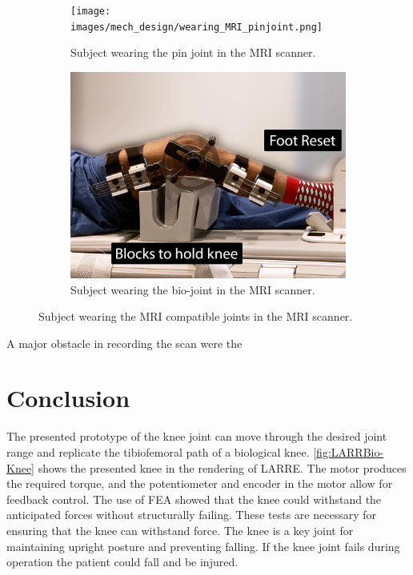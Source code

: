 \begin{figure}
    \begin{subfigure}{\textwidth}
        \centering
        \captionsetup{justification=centering}
        \texttt{[image: images/mech\_design/wearing\_MRI\_pinjoint.png]}
        \caption[Pin Joint in MRI ]{Subject wearing the pin joint in the MRI scanner.}
        \label{fig:MRIPINJoint}
    \end{subfigure}
    \begin{subfigure}{\textwidth}
        \centering
        \includegraphics[width=0.75\linewidth]{images/mech_design/wearing_MRI_bioknee.png}
          \captionsetup{justification=centering}
        \caption[Bio-joint in MRI]{Subject wearing the bio-joint in the MRI scanner.}
        \label{fig:MRIBIOJoint}
    \end{subfigure}

    \caption{Subject wearing the MRI compatible joints in the MRI scanner.}
    \label{fig:MRIKnees}
\end{figure}


A major obstacle in recording the scan were the 



\section{Conclusion}
The presented prototype of the knee joint can move through the desired joint range and replicate the tibiofemoral path of a biological knee. \autoref{fig:LARRBio-Knee} shows the presented knee in the rendering of LARRE. The motor produces the required torque, and the potentiometer and encoder in the motor allow for feedback control. The use of FEA showed that the knee could withstand the anticipated forces without structurally failing. These tests are necessary for ensuring that the knee can withstand force. The knee is a key joint for maintaining upright posture and preventing falling. If the knee joint fails during operation the patient could fall and be injured. 

